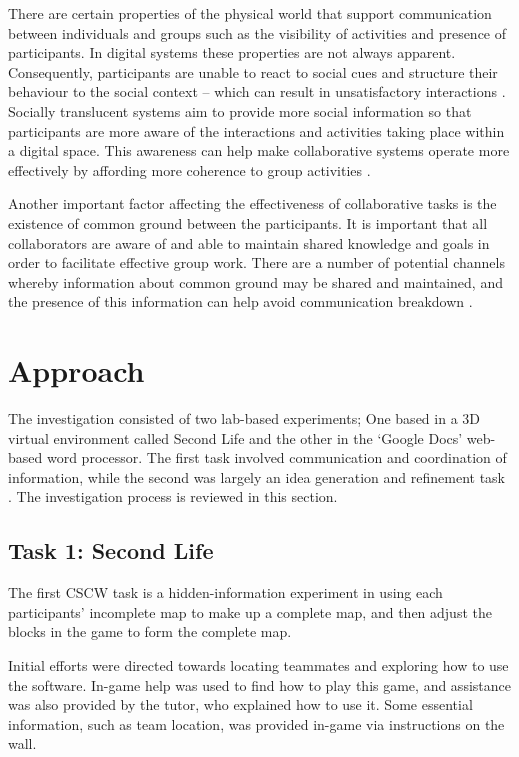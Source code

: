 \documentclass{acm_proc_article-sp}
\begin{document}
There are certain properties of the physical world that support communication between individuals and groups such as the visibility of activities and presence of participants. In digital systems these properties are not always apparent. Consequently, participants are unable to react to social cues and structure their behaviour to the social context  -- which can result in unsatisfactory interactions \cite{ericksonsocial2000}. Socially translucent systems aim to provide more social information so that participants are more aware of the interactions and activities taking place within a digital space. This awareness can help make collaborative systems operate more effectively by affording more coherence to group activities \cite{dinginforming2011}.

Another important factor affecting the effectiveness of collaborative tasks is the existence of common ground between the participants. It is important that all collaborators are aware of and able to maintain shared knowledge and goals in order to facilitate effective group work. There are a number of potential channels whereby information about common ground may be shared and maintained, and the presence of this information can help avoid communication breakdown \cite{monk2003common}.

\section{Approach}

The investigation consisted of two lab-based experiments; One based in a 3D virtual environment called Second Life and the other in the `Google Docs' web-based word processor. The first task involved communication and coordination of information, while the second was largely an idea generation and refinement task \cite{straus1999testing}. The investigation process is reviewed in this section.

\subsection{Task 1: Second Life}

The first CSCW task is a hidden-information experiment in using each participants' incomplete map to make up a complete map, and then adjust the blocks in the game to form the complete map.
 
Initial efforts were directed towards locating teammates and exploring how to use the software. In-game help was used to find how to play this game, and assistance was also provided by the tutor, who explained how to use it. Some essential information, such as team location, was provided in-game via instructions on the wall.
 
\end{document}
